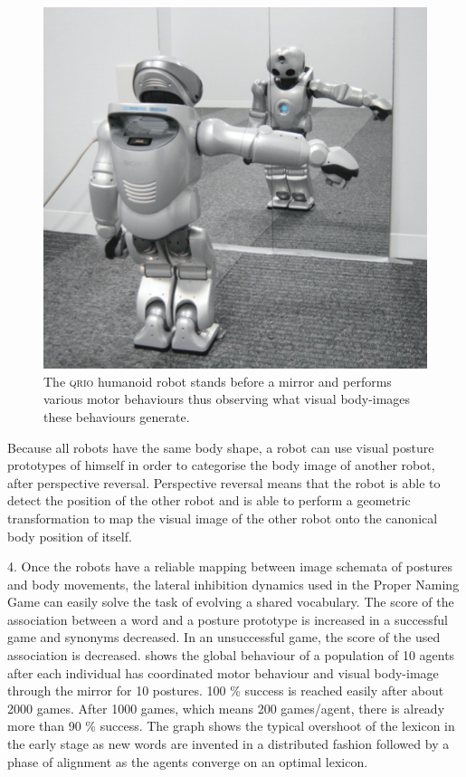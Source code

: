 \begin{figure}[p]
\centerline{\includegraphics[width=0.6\linewidth]{chap11/figs/robot-mirror.pdf}}
\caption{\label{robot-mirror}The \textsc{qrio} humanoid robot stands before a mirror and performs various motor behaviours thus observing what visual body-images these behaviours generate.}
\end{figure}

Because all robots have the same body shape, a robot can use visual posture prototypes of 
himself in order to categorise the body image of another robot, after 
perspective reversal. Perspective reversal means that the robot is able to detect the position of the other 
robot and is able to perform a geometric transformation to map the visual image of the other robot onto 
the canonical body position of itself.

4. Once the robots have a reliable mapping between image schemata of postures and body movements, the 
lateral inhibition dynamics used in the Proper Naming Game can easily solve the task of evolving 
a shared vocabulary. The score of the association between a word and a posture prototype is increased in a successful 
game and synonyms decreased. In an unsuccessful game, the score of the used association is decreased. 
shows the global behaviour of a population of 10 agents after each individual has coordinated motor 
behaviour and visual body-image through the mirror for 10 postures. 100 \% success is reached easily after about 
2000 games. After 1000 games, which means 200 games/agent, there is already more than 90 \% success. 
The graph shows the typical overshoot of the lexicon in the early stage 
as new words are invented in a distributed fashion followed by a phase 
of alignment as the agents converge on an optimal lexicon. 


